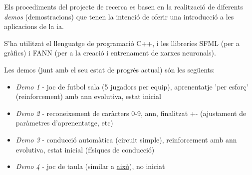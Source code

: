 Els procediments del projecte de recerca es basen en la realització de diferents \emph{demos} (demostracions)
que tenen la intenció de oferir una introducció a les aplicacions de la \ac{ia}.

S'ha utilitzat el llenguatge de programació C++, i les llibreríes SFML \autocite{sfmllib} (per a gràfics) i FANN \cite{fannlib} (per a la
creació i entrenament de xarxes neuronals).

Les demos (junt amb el seu estat de progrés actual) són les següents:

\begin{itemize}
\item \emph{Demo 1} - joc de futbol sala (5 jugadors per equip), aprenentatje 'per esforç' (reinforcement) amb \ac{ann} evolutiva, estat inicial
\item \emph{Demo 2} - reconeixement de caràcters 0-9, \ac{ann}, finalitzat +- (ajustament de paràmetres d'aprenentatge, etc)
\item \emph{Demo 3} - conducció automàtica (circuit simple), reinforcement amb \ac{ann} evolutiva, estat inicial (físiques de conducció)
\item \emph{Demo 4} - joc de taula (similar a \href{http://gabrielecirulli.github.io/2048/}{això}), no iniciat
\end{itemize}